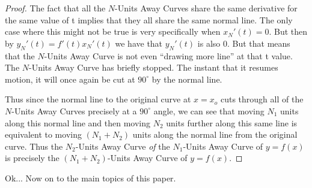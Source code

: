 \begin{proof}

  The fact that all the $N$-Units Away Curves share the same derivative for the same value of t implies that they all share the same normal line. The only case where this might not be true is very specifically when $x_N'(t) = 0$. But then by $y_N'(t) = f'(t) x_N'(t)$ we have that $y_N'(t)$ is also 0. But that means that the $N$-Units Away Curve is not even ``drawing more line'' at that t value. The $N$-Units Away Curve has briefly stopped. The instant that it resumes motion, it will once again be cut at $90 ^{\circ}$ by the normal line.

  Thus since the normal line to the original curve at $x = x_o$ cuts through all of the $N$-Units Away Curves precisely at a $90^{\circ}$ angle, we can see that moving $N_1$ units along this normal line and then moving $N_2$ units further along this same line is equivalent to moving $(N_1 + N_2)$ units along the normal line from the original curve. Thus the $N_2$-Units Away Curve \textit{of} the $N_1$-Units Away Curve of $y = f(x)$ is precisely the $(N_1 + N_2)$-Units Away Curve of $y = f(x)$.

\end{proof}

Ok... Now on to the main topics of this paper.
